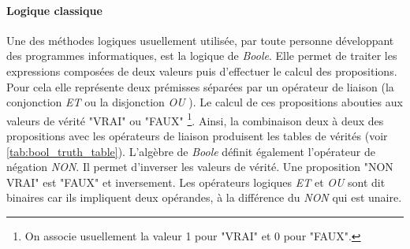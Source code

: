 \begin{refsegment}
    \paragraph{Logique classique}
    
    Une des méthodes logiques usuellement utilisée, par toute personne développant des programmes informatiques, est la logique de \textit{Boole}. Elle permet de traiter les expressions composées de deux valeurs puis d'effectuer le calcul des propositions. Pour cela elle représente deux prémisses séparées par un opérateur de liaison (la conjonction \textit{ET} ou la disjonction \textit{OU} ). Le calcul de ces propositions abouties aux valeurs de vérité "VRAI" ou "FAUX" \footnote{On associe usuellement la valeur 1 pour "VRAI" et 0 pour "FAUX".}. Ainsi, la combinaison deux à deux des propositions avec les opérateurs de liaison produisent les tables de vérités (voir \cref{tab:bool_truth_table}). L'algèbre de \textit{Boole} définit également l'opérateur de négation \textit{NON}. Il permet d'inverser les valeurs de vérité. Une proposition "NON VRAI" est "FAUX" et inversement. Les opérateurs logiques \textit{ET} et \textit{OU} sont dit binaires car ils impliquent deux opérandes, à la différence du \textit{NON} qui est unaire.
    

\end{refsegment}
